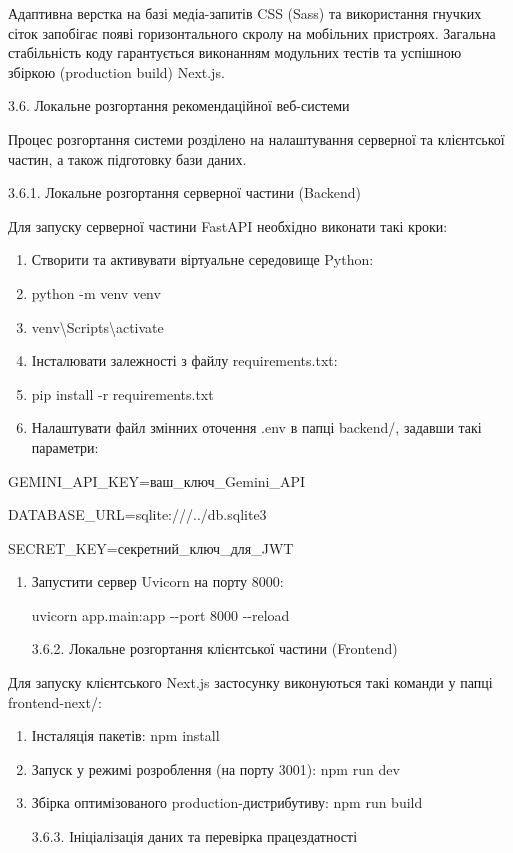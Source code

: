 \documentclass[
]{article}
\begin{document}
Адаптивна верстка на базі медіа-запитів CSS (Sass) та використання
гнучких сіток запобігає появі горизонтального скролу на мобільних
пристроях. Загальна стабільність коду гарантується виконанням модульних
тестів та успішною збіркою (production build) Next.js.

\protect{}\label{_Toc230434101}{}3.6. Локальне розгортання
рекомендаційної веб-системи

Процес розгортання системи розділено на налаштування серверної та
клієнтської частин, а також підготовку бази даних.

3.6.1. Локальне розгортання серверної частини (Backend)

Для запуску серверної частини FastAPI необхідно виконати такі кроки:

\begin{enumerate}
\def\labelenumi{\arabic{enumi}.}
\item
  Створити та активувати віртуальне середовище Python:
\item
  python -m venv venv
\item
  venv\textbackslash Scripts\textbackslash activate
\item
  Інсталювати залежності з файлу requirements.txt:
\item
  pip install -r requirements.txt
\item
  Налаштувати файл змінних оточення .env в папці backend/, задавши такі
  параметри:
\end{enumerate}

GEMINI\_API\_KEY=ваш\_ключ\_Gemini\_API

DATABASE\_URL=sqlite:///../db.sqlite3

SECRET\_KEY=секретний\_ключ\_для\_JWT

\begin{enumerate}
\def\labelenumi{\arabic{enumi}.}
\setcounter{enumi}{28}
\item
  Запустити сервер Uvicorn на порту 8000:

  uvicorn app.main:app -\/-port 8000 -\/-reload

  3.6.2. Локальне розгортання клієнтської частини (Frontend)
\end{enumerate}

Для запуску клієнтського Next.js застосунку виконуються такі команди у
папці frontend-next/:

\begin{enumerate}
\def\labelenumi{\arabic{enumi}.}
\item
  Інсталяція пакетів: npm install
\item
  Запуск у режимі розроблення (на порту 3001): npm run dev
\item
  Збірка оптимізованого production-дистрибутиву: npm run build

  3.6.3. Ініціалізація даних та перевірка працездатності
\end{enumerate}
\end{document}
